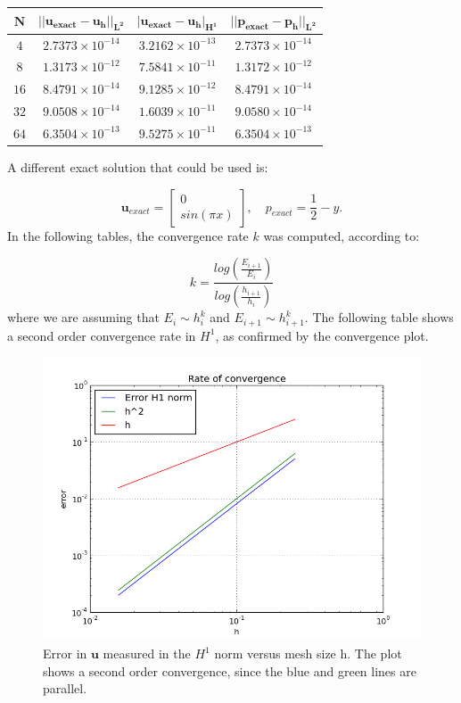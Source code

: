 \documentclass[a4paper,11pt,oneside]{book}
\begin{document}
\begin{center}
\begin{tabular}{| c | c | c | c |}
\hline
$\mathbf{N}$ & $\mathbf{|| u_{exact} - u_h ||_{L^2}}$ & $ \mathbf{ | u_{exact} - u_h |_{H^1}}$ & $  \mathbf{ || p_{exact} - p_h ||_{L^2}}$ \\
\hline
$ 4 $ & $2.7373 \times 10^{-14}$ & $3.2162 \times 10^{-13}$ &  $ 2.7373 \times 10^{-14}$ \\
\hline
$ 8$ & $1.3173  \times 10^{-12}$ & $7.5841 \times 10^{-11}$ &  $ 1.3172  \times 10^{-12}$ \\
\hline
$ 16 $ & $ 8.4791 \times 10^{-14}$ & $9.1285 \times 10^{-12}$ & $ 8.4791 \times 10^{-14}$ \\
\hline
$ 32$ & $9.0508 \times 10^{-14}$ & $1.6039 \times 10^{-11}$ &  $ 9.0580 \times 10^{-14}$ \\
\hline
$ 64$ & $6.3504 \times 10^{-13}$ & $9.5275 \times 10^{-11}$ &  $ 6.3504 \times 10^{-13}$ \\
\hline
\end{tabular}
\end{center}

\newpage
A different exact solution that could be used is:

\[
\mathbf{u}_{exact} = \left[ \begin{array}{c} 0 \\ sin(\pi x) \end{array} \right], \quad
p_{exact} = \frac{1}{2}-y.
\]
In the following tables, the convergence rate $k$ was computed, according to:

\[
k = \frac{log(\frac{E_{i+1}}{E_i})}{log(\frac{h_{i+1}}{h_i})}
\]
where we are assuming that $E_i \sim h^k_i$ and $E_{i+1} \sim h^k_{i+1}$. 
The following table shows a second order convergence rate in $H^1$, as confirmed by the convergence plot.

\vspace{1cm}
\begin{figure}[h!]
\centering
\includegraphics[width=\textwidth]{images/convergence_sine}
\caption{Error in $\mathbf{u}$ measured in the $H^1$ norm versus mesh size h. The plot shows a second order convergence, since the blue and green lines are parallel.}
\end{figure}
\vspace{1cm}
\end{document}
